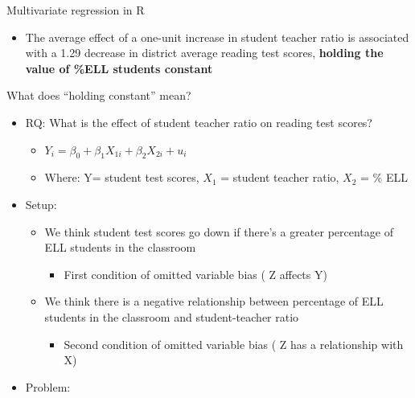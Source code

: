\documentclass[
  8pt,
  ignorenonframetext,
  dvipsnames]{beamer}
\providecommand{\tightlist}{%
  \setlength{\itemsep}{0pt}\setlength{\parskip}{0pt}}
\renewcommand{\textbf}[1]{{\color{darkgray}\bfseries\fontfamily{Montserrat-TOsF}#1}}
\let\olditem\item
\renewcommand{\item}{%
  \olditem\vspace{4pt}
}
\begin{document}
\begin{frame}{Multivariate regression in R}
\begin{itemize}
\begin{itemize}
    \begin{itemize}
    \tightlist
    \item
      The average effect of a one-unit increase in student teacher ratio
      is associated with a 1.29 decrease in district average reading
      test scores, \textbf{holding the value of \%ELL students constant}
    \end{itemize}
  \end{itemize}
\end{itemize}

\end{frame}

\begin{frame}{What does ``holding constant'' mean?}
\protect\hypertarget{what-does-holding-constant-mean}{}

\begin{itemize}
\tightlist
\item
  RQ: What is the effect of student teacher ratio on reading test
  scores?

  \begin{itemize}
  \tightlist
  \item
    \(Y_i = \beta_0 + \beta_1X_{1i} + \beta_2X_{2i} + u_i\)
  \item
    Where: Y= student test scores, \(X_1\) = student teacher ratio,
    \(X_2\) = \% ELL
  \end{itemize}
\item
  Setup:

  \begin{itemize}
  \tightlist
  \item
    We think student test scores go down if there's a greater percentage
    of ELL students in the classroom

    \begin{itemize}
    \tightlist
    \item
      First condition of omitted variable bias ( Z affects Y)
    \end{itemize}
  \item
    We think there is a negative relationship between percentage of ELL
    students in the classroom and student-teacher ratio

    \begin{itemize}
    \tightlist
    \item
      Second condition of omitted variable bias ( Z has a relationship
      with X)
    \end{itemize}
  \end{itemize}
\item
  Problem:


\end{itemize}
\end{frame}
\end{document}

